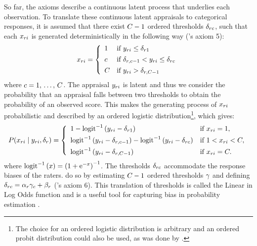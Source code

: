 \documentclass[a4paper,usenames,dvipsnames]{article}
\begin{document}
So far, the axioms describe a continuous latent process that underlies each observation. To translate these continuous latent appraisals to categorical responses, it is assumed that there exist $\Tncat - 1$ ordered thresholds $\delta_{rc}$, such that each $x_{ri}$ is generated deterministically in the following way (\AB{}'s axiom 5):
\begin{align*}
	x_{\Irater\Iitem} = 
	\left\{\begin{array}{ll} 
	1		& \text{if }  \Appraisal_{\Irater\Iitem} \leq \Threshold_{\Irater 1} \\[4pt]
	\Incat	& \text{if }  \Threshold_{\Irater, \Incat-1} <  \Appraisal_{\Irater\Iitem} \leq \Threshold_{\Irater\Incat} \\[4pt]
	\Tncat	& \text{if }  \Appraisal_{\Irater\Iitem} > \Threshold_{\Irater, \Tncat-1}
	\end{array} \right.
\end{align*}
where $\Incat = 1,\,\dots,\,\Tncat$. The appraisal $y_{ri}$ is latent and thus we consider the probability that an appraisal falls between two thresholds to obtain the probability of an observed score. This makes the generating process of $x_{ri}$ probabilistic and described by an ordered logistic distribution\footnote{The choice for an ordered logistic distribution is arbitrary and an ordered probit distribution could also be used, as was done by \AB{}.}, which gives:
\begin{align*}
P(x_{\Irater\Iitem}\mid  \Appraisal_{\Irater\Iitem},\delta_{\Irater}) = 
\left\{\begin{array}{ll} 
1 - \ilogit{\Appraisal_{\Irater\Iitem} - \Threshold_{\Irater 1}}         & \text{if } x_{\Irater\Iitem} = 1, \\[4pt]
	\ilogit{\Appraisal_{\Irater\Iitem} - \Threshold_{\Irater,\Incat-1}} - 
	\ilogit{\Appraisal_{\Irater\Iitem} - \Threshold_{\Irater\Incat}}         & \text{if } 1 < x_{\Irater\Iitem} < \Tncat,\\[4pt]
	\ilogit{\Appraisal_{\Irater\Iitem} - \Threshold_{\Irater,\Tncat-1}}       & \text{if } x_{\Irater\Iitem} = \Tncat. 
\end{array} \right.
\end{align*}
where $\text{logit}^{-1}\left(x\right) = \left(1 + \mathrm{e}^{-x}\right)^{-1}$. The thresholds $\delta_{rc}$ accommodate the response biases of the raters. \AB{} do so by estimating $\Tncat-1$ ordered thresholds $\gamma$ and defining $\delta_{rc} = \alpha_r \gamma_c + \beta_r$ (\AB{}'s axiom 6). This translation of thresholds is called the Linear in Log Odds function and is a useful tool for capturing bias in probability estimation \cite{Fox1995, Gonzalez1999, Anders2015cultural}.
\end{document}
